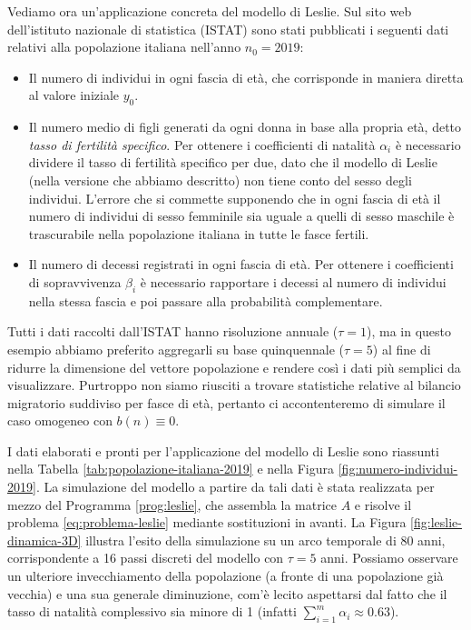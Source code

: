 Vediamo ora un'applicazione concreta del modello di Leslie.
Sul sito web dell'istituto nazionale di statistica (ISTAT) sono stati
pubblicati i seguenti dati relativi alla popolazione italiana
nell'anno $n_0 = 2019$:
\begin{itemize}
\item Il numero di individui in ogni fascia di età, che corrisponde
in maniera diretta al valore iniziale $y_0$.
\item Il numero medio di figli generati da ogni donna in base alla propria
età, detto \emph{tasso di fertilità specifico}. Per ottenere i coefficienti
di natalità $\alpha_i$ è necessario dividere il tasso di fertilità specifico
per due, dato che il modello di Leslie (nella versione che abbiamo descritto)
non tiene conto del sesso degli individui.
L'errore che si commette supponendo che in ogni fascia di età il numero
di individui di sesso femminile sia uguale a quelli di sesso maschile
è trascurabile nella popolazione italiana in tutte le fasce fertili.
\item Il numero di decessi registrati in ogni fascia di età.
Per ottenere i coefficienti di sopravvivenza $\beta_i$ è necessario
rapportare i decessi al numero di individui nella stessa fascia
e poi passare alla probabilità complementare.
\end{itemize}
Tutti i dati raccolti dall'ISTAT hanno risoluzione annuale ($\tau = 1$),
ma in questo esempio abbiamo preferito aggregarli su base
quinquennale ($\tau = 5$) al fine di ridurre la dimensione del vettore popolazione
e rendere così i dati più semplici da visualizzare.
Purtroppo non siamo riusciti a trovare statistiche relative al bilancio
migratorio suddiviso per fasce di età, pertanto ci accontenteremo
di simulare il caso omogeneo con $b(n) \equiv 0$.

I dati elaborati e pronti per l'applicazione del modello
di Leslie sono riassunti nella Tabella \ref{tab:popolazione-italiana-2019}
e nella Figura \ref{fig:numero-individui-2019}.
La simulazione del modello a partire da tali dati è stata realizzata
per mezzo del Programma \ref{prog:leslie}, che assembla la matrice $A$
e risolve il problema \eqref{eq:problema-leslie} mediante sostituzioni
in avanti. La Figura \ref{fig:leslie-dinamica-3D} illustra l'esito
della simulazione su un arco temporale di 80 anni, corrispondente
a 16 passi discreti del modello con $\tau = 5$ anni.
Possiamo osservare un ulteriore invecchiamento della popolazione (a fronte
di una popolazione già vecchia) e una sua generale diminuzione, com'è
lecito aspettarsi dal fatto che il tasso di natalità complessivo
sia minore di 1 (infatti $\sum_{i=1}^m \alpha_i \approx 0.63$).

